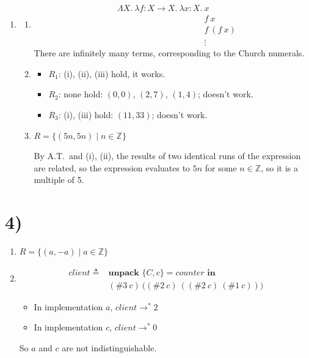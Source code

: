 \documentclass[11pt]{article}
\newcommand{\true}{\mathsf{true}}
\newcommand{\false}{\mathsf{false}}
\begin{document}
\begin{enumerate}[label=\arabic*.]
  We can't access the value of the argument, so we can either return $\true$ or $\false$.

  \item[5.] \phantom{x}
  \begin{enumerate}[label=\alph*.]
    \item
    \begin{align*}
      &\Lambda X.\ \lambda f{:}X \to X.\ \lambda x{:}X.\ x\\
      &\phantom{\Lambda X.\ \lambda f{:}X \to X.\ \lambda x{:}X.\ } f\ x\\
      &\phantom{\Lambda X.\ \lambda f{:}X \to X.\ \lambda x{:}X.\ } f\ (f\ x)\\
      &\phantom{\Lambda X.\ \lambda f{:}X \to X.\ \lambda x{:}X.\ } \vdots
    \end{align*}
    There are infinitely many terms, corresponding to the Church numerals.

    \item
    \begin{itemize}
      \item $R_1$: (i), (ii), (iii) hold, it works.
      \item $R_2$: none hold: $(0,0)$, $(2,7)$, $(1,4)$; doesn't work.
      \item $R_3$: (i), (iii) hold: $(11,33)$; doesn't work.
    \end{itemize}

    \item $R = \{(5n, 5n) \mid n \in \mathbb{Z}\}$

    By A.T.\ and (i), (ii), the results of two identical runs of the expression are related, so the expression evaluates to $5n$ for some $n \in \mathbb{Z}$, so it is a multiple of 5.
  \end{enumerate}
\end{enumerate}

\section*{4)}
\begin{enumerate}[label=\alph*.]
  \item $R = \{(a, -a) \mid a \in \mathbb{Z}\}$

  \item
  \begin{align*}
    \mathit{client} \triangleq{}& \textbf{unpack } \{C, c\} = \mathit{counter} \textbf{ in}\\
    & (\#3\ c)\ \big((\#2\ c)\ ((\#2\ c)\ (\#1\ c))\big)
  \end{align*}

  \begin{itemize}
    \item In implementation $a$, $\mathit{client} \to^{*} 2$
    \item In implementation $c$, $\mathit{client} \to^{*} 0$
  \end{itemize}

  So $a$ and $c$ are not indistinguishable.
\end{enumerate}
\end{document}
